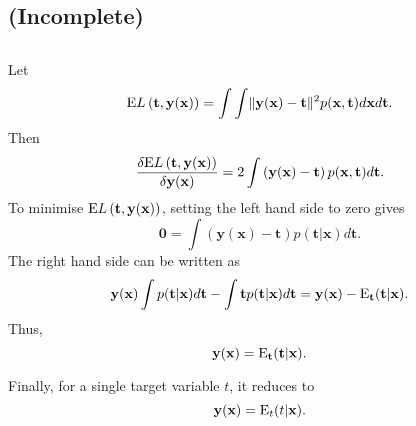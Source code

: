 \subsection{(Incomplete)}


\subsection{}
Let
%
\begin{equation}
{\rm E} L\left( \mathbf{t}, \mathbf{y} (\mathbf{x}) \right) = \int \int \lVert \mathbf{y}(\mathbf{x}) - \mathbf{t} \rVert ^ 2 p(\mathbf{x}, \mathbf{t}) d\mathbf{x} d\mathbf{t}.
\end{equation}
%
Then
%
\begin{equation}
\frac{\delta {\rm E} L\left( \mathbf{t}, \mathbf{y} (\mathbf{x}) \right)}{\delta \mathbf{y} (\mathbf{x})} = 2 \int \left( \mathbf{y} (\mathbf{x}) - \mathbf{t} \right) p(\mathbf{x}, \mathbf{t}) d\mathbf{t}.
\end{equation}
%
To minimise ${\rm E} L\left( \mathbf{t}, \mathbf{y} (\mathbf{x}) \right)$, setting the left hand side to zero gives
%
\begin{equation}
\mathbf{0} = \int \left( \mathbf{y}(\mathbf{x}) - \mathbf{t} \right) p(\mathbf{t} | \mathbf{x}) d\mathbf{t}.
\end{equation}
%
The right hand side can be written as
%
\begin{equation}
\mathbf{y}(\mathbf{x}) \int p(\mathbf{t} | \mathbf{x}) d\mathbf{t} - \int \mathbf{t} p(\mathbf{t} | \mathbf{x}) d\mathbf{t} = \mathbf{y}(\mathbf{x}) - {\rm E}_\mathbf{t} (\mathbf{t} | \mathbf{x}).
\end{equation}
%
Thus,
%
\begin{equation}
\mathbf{y}(\mathbf{x}) = {\rm E}_\mathbf{t} (\mathbf{t} | \mathbf{x}).
\end{equation}
%

Finally, for a single target variable $t$, it reduces to 
%
\begin{equation}
\mathbf{y}(\mathbf{x}) = {\rm E}_t (t | \mathbf{x}).
\end{equation}
%


